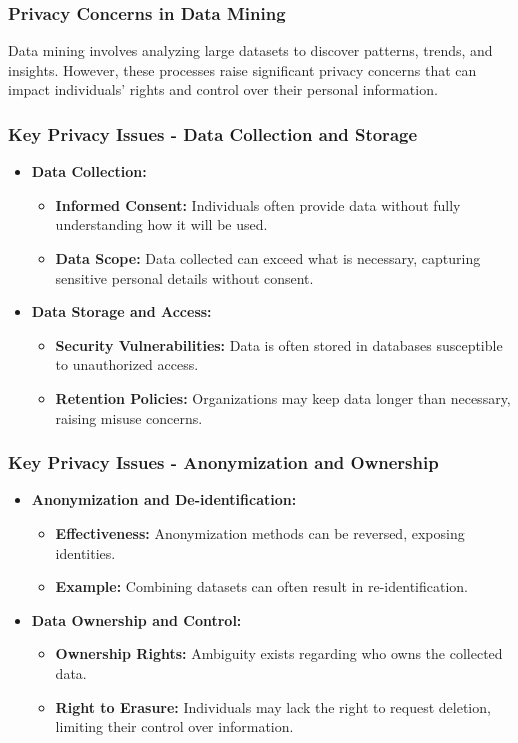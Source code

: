 \documentclass{beamer}
\begin{document}
\begin{frame}[fragile]
    \frametitle{Privacy Concerns in Data Mining}
    Data mining involves analyzing large datasets to discover patterns, trends, and insights. 
    However, these processes raise significant privacy concerns that can impact individuals’ rights and control over their personal information.
\end{frame}

\begin{frame}[fragile]
    \frametitle{Key Privacy Issues - Data Collection and Storage}
    \begin{itemize}
        \item \textbf{Data Collection:}
        \begin{itemize}
            \item \textbf{Informed Consent:} Individuals often provide data without fully understanding how it will be used.
            \item \textbf{Data Scope:} Data collected can exceed what is necessary, capturing sensitive personal details without consent.
        \end{itemize}
        \item \textbf{Data Storage and Access:}
        \begin{itemize}
            \item \textbf{Security Vulnerabilities:} Data is often stored in databases susceptible to unauthorized access.
            \item \textbf{Retention Policies:} Organizations may keep data longer than necessary, raising misuse concerns.
        \end{itemize}
    \end{itemize}
\end{frame}

\begin{frame}[fragile]
    \frametitle{Key Privacy Issues - Anonymization and Ownership}
    \begin{itemize}
        \item \textbf{Anonymization and De-identification:}
        \begin{itemize}
            \item \textbf{Effectiveness:} Anonymization methods can be reversed, exposing identities.
            \item \textbf{Example:} Combining datasets can often result in re-identification.
        \end{itemize}
        \item \textbf{Data Ownership and Control:}
        \begin{itemize}
            \item \textbf{Ownership Rights:} Ambiguity exists regarding who owns the collected data.
            \item \textbf{Right to Erasure:} Individuals may lack the right to request deletion, limiting their control over information.
        \end{itemize}
    \end{itemize}
\end{frame}
\end{document}
